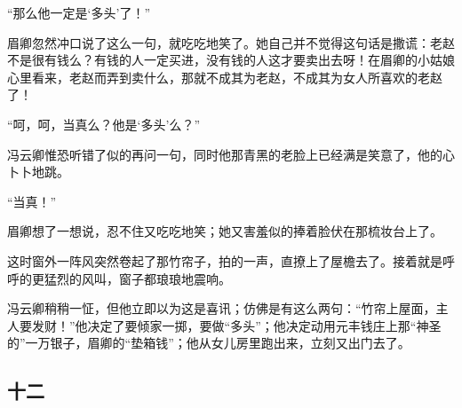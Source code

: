 \par “那么他一定是‘多头’了！”
\par 眉卿忽然冲口说了这么一句，就吃吃地笑了。她自己并不觉得这句话是撒谎：老赵不是很有钱么？有钱的人一定买进，没有钱的人这才要卖出去呀！在眉卿的小姑娘心里看来，老赵而弄到卖什么，那就不成其为老赵，不成其为女人所喜欢的老赵了！
\par “呵，呵，当真么？他是‘多头’么？”
\par 冯云卿惟恐听错了似的再问一句，同时他那青黑的老脸上已经满是笑意了，他的心卜卜地跳。
\par “当真！”
\par 眉卿想了一想说，忍不住又吃吃地笑；她又害羞似的捧着脸伏在那梳妆台上了。
\par 这时窗外一阵风突然卷起了那竹帘子，拍的一声，直撩上了屋檐去了。接着就是呼呼的更猛烈的风叫，窗子都琅琅地震响。
\par 冯云卿稍稍一怔，但他立即以为这是喜讯；仿佛是有这么两句：“竹帘上屋面，主人要发财！”他决定了要倾家一掷，要做“多头”；他决定动用元丰钱庄上那“神圣的”一万银子，眉卿的“垫箱钱”；他从女儿房里跑出来，立刻又出门去了。




\subsection*{十二}


